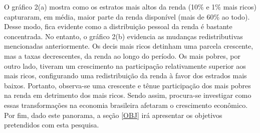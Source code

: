 O gráfico 2(a) mostra como os estratos mais altos da renda (10\% e 1\% mais ricos) capturaram, em média, maior parte da renda disponível (mais de 60\% ao todo). Desse modo, fica evidente como a distribuição pessoal da renda é bastante concentrada. No entanto, o gráfico 2(b) evidencia as mudanças redistributivas mencionadas anteriormente. Os decis mais ricos detinham uma parcela crescente, mas a taxas decrescentes, da renda ao longo do período. Os mais pobres, por outro lado, tiveram um crescimento na participação relativamente superior aos mais ricos, configurando uma redistribuição da renda à favor dos estrados mais baixos. Portanto, observa-se uma crescente e tênue participação dos mais pobres na renda em detrimento dos mais ricos. 
Sendo assim, procura-se investigar como essas transformações na economia brasileira afetaram o crescimento econômico.
Por fim, dado este panorama, a seção \ref{OBJ} irá apresentar os objetivos pretendidos com esta pesquisa.
